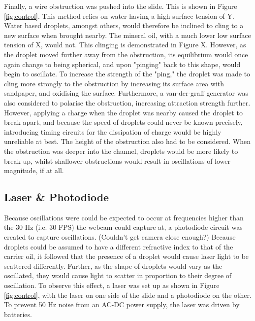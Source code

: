 \documentclass{physics_article_B}
\begin{document}
        Finally, a wire obstruction was pushed into the slide. This is shown in Figure \ref{fig:control}. This method relies on water having a high surface tension of Y. Water based droplets, amongst others, would therefore be inclined to cling to a new surface when brought nearby. The mineral oil, with a much lower low surface tension of X, would not. This clinging is demonstrated in Figure X. However, as the droplet moved further away from the obstruction, its equilibrium would once again change to being spherical, and upon "pinging" back to this shape, would begin to oscillate. To increase the strength of the "ping," the droplet was made to cling more strongly to the obstruction by increasing its surface area with sandpaper, and oxidising the surface. Furthermore, a van-der-graff generator was also considered to polarise the obstruction, increasing attraction strength further. However, applying a charge when the droplet was nearby caused the droplet to break apart, and because the speed of droplets could never be known precisely, introducing timing circuits for the dissipation of charge would be highly unreliable at best. The height of the obstruction also had to be considered. When the obstruction was deeper into the channel, droplets would be more likely to break up, whilst shallower obstructions would result in oscillations of lower magnitude, if at all.  
             
        
    \subsection{Laser \& Photodiode\label{sect:method:laser}}
    
        Because oscillations were could be expected to occur at frequencies higher than the 30 Hz (i.e. 30 FPS) the webcam could capture at, a photodiode circuit was created to capture oscillations. (Couldn't get camera close enough?) Because droplets could be assumed to have a different refractive index to that of the carrier oil\cite{viscosity1,viscosity2}, it followed that the presence of a droplet would cause laser light to be scattered differently. Further, as the shape of droplets would vary as the oscillated, they would cause light to scatter in proportion to their degree of oscillation. To observe this effect, a laser was set up as shown in Figure \ref{fig:control}, with the laser on one side of the slide and a photodiode on the other. To prevent 50 Hz noise from an AC-DC power supply, the laser was driven by batteries.
        
\end{document}
